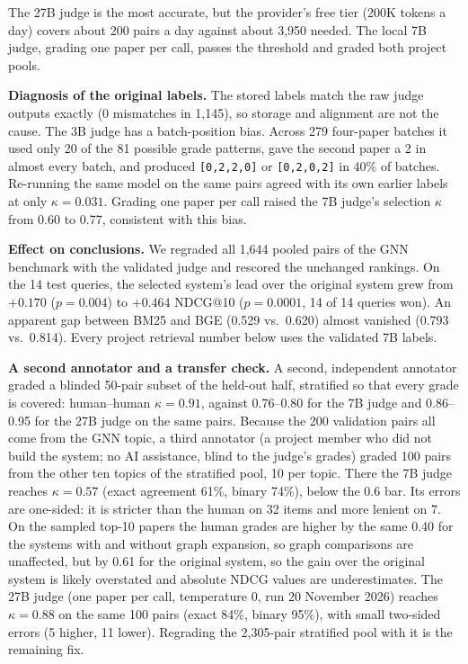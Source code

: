 \documentclass[conference]{IEEEtran}
\begin{document}
The 27B judge is the most accurate, but the provider's free tier (200K tokens a day) covers about 200 pairs a day against about 3,950 needed. The local 7B judge, grading one paper per call, passes the threshold and graded both project pools.

\textbf{Diagnosis of the original labels.} The stored labels match the raw judge outputs exactly (0 mismatches in 1,145), so storage and alignment are not the cause. The 3B judge has a batch-position bias. Across 279 four-paper batches it used only 20 of the 81 possible grade patterns, gave the second paper a 2 in almost every batch, and produced \texttt{[0,2,2,0]} or \texttt{[0,2,0,2]} in 40\% of batches. Re-running the same model on the same pairs agreed with its own earlier labels at only $\kappa = 0.031$. Grading one paper per call raised the 7B judge's selection $\kappa$ from 0.60 to 0.77, consistent with this bias.

\textbf{Effect on conclusions.} We regraded all 1,644 pooled pairs of the GNN benchmark with the validated judge and rescored the unchanged rankings. On the 14 test queries, the selected system's lead over the original system grew from $+0.170$ ($p = 0.004$) to $+0.464$ NDCG@10 ($p = 0.0001$, 14 of 14 queries won). An apparent gap between BM25 and BGE (0.529 vs.\ 0.620) almost vanished (0.793 vs.\ 0.814). Every project retrieval number below uses the validated 7B labels.

\textbf{A second annotator and a transfer check.} A second, independent annotator graded a blinded 50-pair subset of the held-out half, stratified so that every grade is covered: human--human $\kappa = 0.91$, against 0.76--0.80 for the 7B judge and 0.86--0.95 for the 27B judge on the same pairs. Because the 200 validation pairs all come from the GNN topic, a third annotator (a project member who did not build the system; no AI assistance, blind to the judge's grades) graded 100 pairs from the other ten topics of the stratified pool, 10 per topic. There the 7B judge reaches $\kappa = 0.57$ (exact agreement 61\%, binary 74\%), below the 0.6 bar. Its errors are one-sided: it is stricter than the human on 32 items and more lenient on 7. On the sampled top-10 papers the human grades are higher by the same 0.40 for the systems with and without graph expansion, so graph comparisons are unaffected, but by 0.61 for the original system, so the gain over the original system is likely overstated and absolute NDCG values are underestimates. The 27B judge (one paper per call, temperature 0, run 20 November 2026) reaches $\kappa = 0.88$ on the same 100 pairs (exact 84\%, binary 95\%), with small two-sided errors (5 higher, 11 lower). Regrading the 2,305-pair stratified pool with it is the remaining fix.
\end{document}
